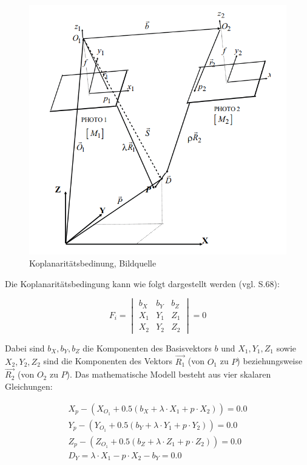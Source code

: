\begin{figure}[H]
	\centering
	\includegraphics[scale=0.6]{coplanarity.png}
	\caption{Koplanaritätsbedinung, Bildquelle \cite{comparative_conditions_study}}
\end{figure} 

Die Koplanaritätsbedingung kann wie folgt dargestellt werden (vgl. \cite{comparative_conditions_study} S.68):

\begin{equation}
F_i = \begin{vmatrix}
b_X & b_Y & b_Z \\
X_1 & Y_1 & Z_1 \\
X_2 & Y_2 & Z_2
\end{vmatrix}
=0
\end{equation}

Dabei sind $b_X,b_Y,b_Z$ die Komponenten des Basisvektors $b$ und $X_1,Y_1,Z_1$ sowie $X_2,Y_2,Z_2$ sind die Komponenten des Vektors $\vec{R_1}$ (von $O_1$ zu $P$) beziehungsweise  $\vec{R_2}$ (von $O_2$ zu $P$). Das mathematische Modell besteht aus vier skalaren Gleichungen:

\begin{equation}
\begin{aligned}
X_p - (X_{O_1}+0.5(b_X+ \lambda \cdot X_1 + p \cdot X_2)) = 0.0 \\
Y_p - (Y_{O_1}+0.5(b_Y+ \lambda \cdot Y_1 + p \cdot Y_2)) = 0.0 \\
Z_p - (Z_{O_1}+0.5(b_Z+ \lambda \cdot Z_1 + p \cdot Z_2)) = 0.0 \\
D_Y = \lambda\cdot X_1-p\cdot X_2-b_Y = 0.0
\end{aligned}
\end{equation}

